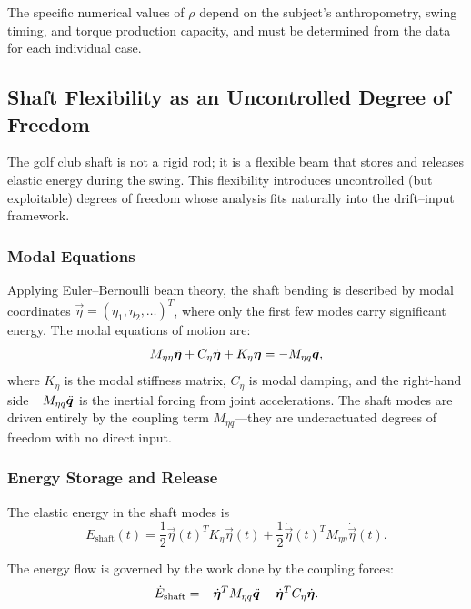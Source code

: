 The specific numerical values of $\rho$ depend on the subject's anthropometry, swing
timing, and torque production capacity, and must be determined from the data for
each individual case.

\subsection{Shaft Flexibility as an Uncontrolled Degree of Freedom}

The golf club shaft is not a rigid rod; it is a flexible beam that stores and releases
elastic energy during the swing. This flexibility introduces uncontrolled (but exploitable)
degrees of freedom whose analysis fits naturally into the drift--input framework.

\subsubsection{Modal Equations}

Applying Euler--Bernoulli beam theory, the shaft bending is described by modal coordinates
$\vec\eta = (\eta_1, \eta_2, \ldots)^T$, where only the first few modes carry significant
energy. The modal equations of motion are:
\begin{equation}
M_{\eta\eta}\ddot{\bm{\eta}} + C_{\eta}\dot{\bm{\eta}} + K_{\eta}\bm{\eta}
= -M_{\eta q}\ddot{\bm{q}},
\label{eq:ch8:shaft-modal}
\end{equation}
where $K_{\eta}$ is the modal stiffness matrix, $C_{\eta}$ is modal damping, and
the right-hand side $-M_{\eta q}\ddot{\bm{q}}$ is the inertial forcing from joint accelerations.
The shaft modes are driven entirely by the coupling term $M_{\eta q}$---they are
underactuated degrees of freedom with no direct input.

\subsubsection{Energy Storage and Release}

The elastic energy in the shaft modes is
\begin{equation}
E_{\text{shaft}}(t) = \frac{1}{2}\vec\eta(t)^T K_\eta \vec\eta(t)
+ \frac{1}{2}\dot{\vec\eta}(t)^T M_{\eta\eta} \dot{\vec\eta}(t).
\label{eq:ch8:shaft-energy}
\end{equation}

The energy flow is governed by the work done by the coupling forces:
\begin{equation}
\dot{E}_{\text{shaft}} = -\dot{\bm{\eta}}^T M_{\eta q}\ddot{\bm{q}}
- \dot{\bm{\eta}}^T C_\eta \dot{\bm{\eta}}.
\label{eq:ch8:shaft-power}
\end{equation}

